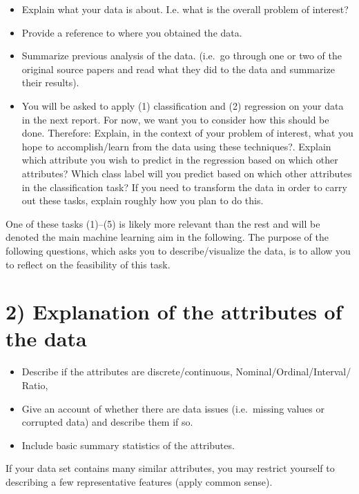 \documentclass[
]{article}
\providecommand{\tightlist}{%
  \setlength{\itemsep}{0pt}\setlength{\parskip}{0pt}}
\begin{document}
\begin{itemize}
\tightlist
\item
  Explain what your data is about. I.e. what is the overall problem of
  interest?
\item
  Provide a reference to where you obtained the data.
\item
  Summarize previous analysis of the data. (i.e.~go through one or two
  of the original source papers and read what they did to the data and
  summarize their results).
\item
  You will be asked to apply (1) classification and (2) regression on
  your data in the next report. For now, we want you to consider how
  this should be done. Therefore: Explain, in the context of your
  problem of interest, what you hope to accomplish/learn from the data
  using these techniques?. Explain which attribute you wish to predict
  in the regression based on which other attributes? Which class label
  will you predict based on which other attributes in the classification
  task? If you need to transform the data in order to carry out these
  tasks, explain roughly how you plan to do this.
\end{itemize}

One of these tasks (1)--(5) is likely more relevant than the rest and
will be denoted the main machine learning aim in the following. The
purpose of the following questions, which asks you to describe/visualize
the data, is to allow you to reflect on the feasibility of this task.

\section{2) Explanation of the attributes of the
data}\label{explanation-of-the-attributes-of-the-data}

\begin{itemize}
\tightlist
\item
  Describe if the attributes are discrete/continuous,
  Nominal/Ordinal/Interval/ Ratio,
\item
  Give an account of whether there are data issues (i.e.~missing values
  or corrupted data) and describe them if so.
\item
  Include basic summary statistics of the attributes.
\end{itemize}

If your data set contains many similar attributes, you may restrict
yourself to describing a few representative features (apply common
sense).
\end{document}
